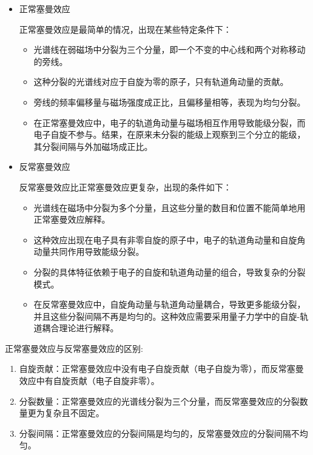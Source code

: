 \documentclass[dvipsnames, svgnames,a4paper,11pt]{article}
\begin{document}
		\begin{itemize}
			\item 正常塞曼效应
			
				正常塞曼效应是最简单的情况，出现在某些特定条件下：

				\begin{itemize}
					\item 光谱线在弱磁场中分裂为三个分量，即一个不变的中心线和两个对称移动的旁线。
					\item 这种分裂的光谱线对应于自旋为零的原子，只有轨道角动量的贡献。
					\item 旁线的频率偏移量与磁场强度成正比，且偏移量相等，表现为均匀分裂。
					\item 在正常塞曼效应中，电子的轨道角动量与磁场相互作用导致能级分裂，而电子自旋不参与。结果，在原来未分裂的能级上观察到三个分立的能级，其分裂间隔与外加磁场成正比。
				\end{itemize}
			
			
			\item 反常塞曼效应
			
				反常塞曼效应比正常塞曼效应更复杂，出现的条件如下：

				\begin{itemize}
					\item 光谱线在磁场中分裂为多个分量，且这些分量的数目和位置不能简单地用正常塞曼效应解释。
					\item 这种效应出现在电子具有非零自旋的原子中，电子的轨道角动量和自旋角动量共同作用导致能级分裂。
					\item 分裂的具体特征依赖于电子的自旋和轨道角动量的组合，导致复杂的分裂模式。
					\item 在反常塞曼效应中，自旋角动量与轨道角动量耦合，导致更多能级分裂，并且这些分裂间隔不再是均匀的。这种效应需要采用量子力学中的自旋-轨道耦合理论进行解释。
				\end{itemize}
			
			
		\end{itemize}


	正常塞曼效应与反常塞曼效应的区别:
		
		\begin{enumerate}
			\item 自旋贡献：正常塞曼效应中没有电子自旋贡献（电子自旋为零），而反常塞曼效应中有自旋贡献（电子自旋非零）。
			\item 分裂数量：正常塞曼效应的光谱线分裂为三个分量，而反常塞曼效应的分裂数量更为复杂且不固定。
			\item 分裂间隔：正常塞曼效应的分裂间隔是均匀的，反常塞曼效应的分裂间隔不均匀。
		\end{enumerate}
\end{document}
